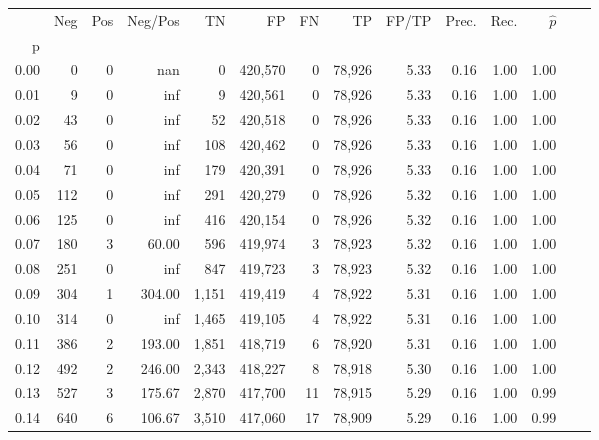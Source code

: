 \begin{tabular}{rrrrrrrrrrrrrr}
\toprule
{} &    Neg &    Pos & Neg/Pos &       TN &       FP &      FN &      TP & FP/TP & Prec. &  Rec. & $\hat{p}$ \\
p    &        &        &         &          &          &         &         &       &       &       &           \\
\midrule
0.00 &      0 &      0 &     nan &        0 &  420,570 &       0 &  78,926 &  5.33 &  0.16 &  1.00 &      1.00 \\
0.01 &      9 &      0 &     inf &        9 &  420,561 &       0 &  78,926 &  5.33 &  0.16 &  1.00 &      1.00 \\
0.02 &     43 &      0 &     inf &       52 &  420,518 &       0 &  78,926 &  5.33 &  0.16 &  1.00 &      1.00 \\
0.03 &     56 &      0 &     inf &      108 &  420,462 &       0 &  78,926 &  5.33 &  0.16 &  1.00 &      1.00 \\
0.04 &     71 &      0 &     inf &      179 &  420,391 &       0 &  78,926 &  5.33 &  0.16 &  1.00 &      1.00 \\
0.05 &    112 &      0 &     inf &      291 &  420,279 &       0 &  78,926 &  5.32 &  0.16 &  1.00 &      1.00 \\
0.06 &    125 &      0 &     inf &      416 &  420,154 &       0 &  78,926 &  5.32 &  0.16 &  1.00 &      1.00 \\
0.07 &    180 &      3 &   60.00 &      596 &  419,974 &       3 &  78,923 &  5.32 &  0.16 &  1.00 &      1.00 \\
0.08 &    251 &      0 &     inf &      847 &  419,723 &       3 &  78,923 &  5.32 &  0.16 &  1.00 &      1.00 \\
0.09 &    304 &      1 &  304.00 &    1,151 &  419,419 &       4 &  78,922 &  5.31 &  0.16 &  1.00 &      1.00 \\
0.10 &    314 &      0 &     inf &    1,465 &  419,105 &       4 &  78,922 &  5.31 &  0.16 &  1.00 &      1.00 \\
0.11 &    386 &      2 &  193.00 &    1,851 &  418,719 &       6 &  78,920 &  5.31 &  0.16 &  1.00 &      1.00 \\
0.12 &    492 &      2 &  246.00 &    2,343 &  418,227 &       8 &  78,918 &  5.30 &  0.16 &  1.00 &      1.00 \\
0.13 &    527 &      3 &  175.67 &    2,870 &  417,700 &      11 &  78,915 &  5.29 &  0.16 &  1.00 &      0.99 \\
0.14 &    640 &      6 &  106.67 &    3,510 &  417,060 &      17 &  78,909 &  5.29 &  0.16 &  1.00 &      0.99 \\

\end{tabular}
